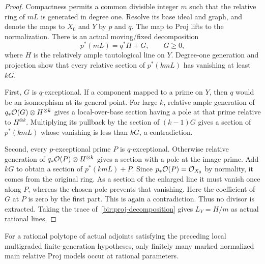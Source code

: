 \begin{proof}
Compactness permits a common divisible integer $m$ such that the
relative ring of $mL$ is generated in degree one.  Resolve its base
ideal and graph, and denote the maps to $X_0$ and $Y$ by $p$ and $q$.
The map to Proj lifts to the normalization.  There is an actual
moving/fixed decomposition
\begin{equation}
 p^*(mL)=q^*H+G,\qquad G\geq0,
 \label{bir:proj-decomposition}
\end{equation}
where $H$ is the relatively ample tautological line on $Y$.  Degree-one
generation and projection show that every relative section of
$p^*(kmL)$ has vanishing at least $kG$.

First, $G$ is $q$-exceptional.  If a component mapped to a prime on
$Y$, then $q$ would be an isomorphism at its general point.  For large
$k$, relative ample generation of
$q_*\mathcal{O}(G)\otimes H^{\otimes k}$ gives a local-over-base section having
a pole at that prime relative to $H^{\otimes k}$.  Multiplying its
pullback by the section of $(k-1)G$ gives a section of $p^*(kmL)$ whose
vanishing is less than $kG$, a contradiction.

Second, every $p$-exceptional prime $P$ is $q$-exceptional.  Otherwise
relative generation of $q_*\mathcal{O}(P)\otimes H^{\otimes k}$ gives a section
with a pole at the image prime.  Add $kG$ to obtain a section of
$p^*(kmL)+P$.  Since $p_*\mathcal{O}(P)=\mathcal{O}_{X_0}$ by normality, it comes from
the original ring.  As a section of the enlarged line it must vanish
once along $P$, whereas the chosen pole prevents that vanishing.
Here the coefficient of $G$ at $P$ is zero by the first part.  This is
again a contradiction.  Thus no divisor is extracted.  Taking the
trace of~\eqref{bir:proj-decomposition} gives $L_Y=H/m$ as actual
rational lines.
\end{proof}

\begin{lemma}
\label{bir:finite-models}
For a rational polytope of actual adjoints satisfying the preceding
local multigraded finite-generation hypotheses, only finitely many
marked normalized main relative Proj models occur at rational
parameters.
\end{lemma}

